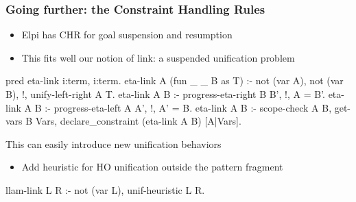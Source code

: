 \documentclass{pres}
\begin{document}
\begin{frame}[fragile]
  \frametitle{Going further: the Constraint Handling Rules}

  \begin{itemize}
    \item Elpi has CHR for goal suspension and resumption
    \item This fits well our notion of link: a suspended unification problem
  \end{itemize}

  \begin{elpicode}
    pred eta-link i:term, i:term.
    eta-link A (fun _ _ B as T) :- not (var A), not (var B), !, 
      unify-left-right A T. 
    eta-link A B :- progress-eta-right B B', !, A = B'. 
    eta-link A B :- progress-eta-left  A A', !, A' = B.
    eta-link A B :- scope-check A B, get-vars B Vars, 
      declare_constraint (eta-link A B) [A|Vars].
  \end{elpicode}
  \mysep

  This can easily introduce new unification behaviors
  \begin{itemize}
    \item Add heuristic for HO unification outside the pattern fragment
  \end{itemize}


  \begin{elpicode}
    llam-link L R :- not (var L), unif-heuristic L R.
  \end{elpicode}



\end{frame}
\end{document}

